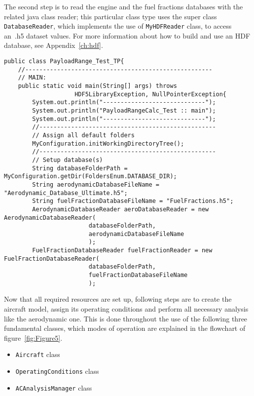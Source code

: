 The second step is to read the engine and the fuel fractions databases with the related java class reader; this particular class type uses the super class \lstinline[language=Java]!DatabaseReader!, which implements the use of \lstinline[language=Java]!MyHDFReader! class, to access an~.h5 dataset values. For more information about how to build and use an HDF database, see Appendix~\ref{ch:hdf}.

\bigskip
\begin{lstlisting}[caption={Excerpt of the ATR-72 Payload-Range test - preliminary steps}, captionpos=b, tabsize=2]
public class PayloadRange_Test_TP{
	//-----------------------------------------------------
	// MAIN:
	public static void main(String[] args) throws
					HDF5LibraryException, NullPointerException{
		System.out.println("-----------------------------");
		System.out.println("PayloadRangeCalc_Test :: main");
		System.out.println("-----------------------------");
		//--------------------------------------------------
		// Assign all default folders
		MyConfiguration.initWorkingDirectoryTree();
		//--------------------------------------------------
		// Setup database(s)	
		String databaseFolderPath = MyConfiguration.getDir(FoldersEnum.DATABASE_DIR);
		String aerodynamicDatabaseFileName = "Aerodynamic_Database_Ultimate.h5";
		String fuelFractionDatabaseFileName = "FuelFractions.h5";
		AerodynamicDatabaseReader aeroDatabaseReader = new AerodynamicDatabaseReader(
						databaseFolderPath,
						aerodynamicDatabaseFileName
						);
		FuelFractionDatabaseReader fuelFractionReader = new FuelFractionDatabaseReader(
						databaseFolderPath,
						fuelFractionDatabaseFileName
						);
\end{lstlisting}

\noindent
Now that all required resources are set up, following steps are to create the aircraft model, assign its operating conditions and perform all necessary analysis like the aerodynamic one. This is done throughout the use of the following three fundamental classes, which modes of operation are explained in the flowchart of figure~\ref{fig:Figure5}.

\begin{itemize}
\item\lstinline[language=Java]!Aircraft! class
\item\lstinline[language=Java]!OperatingConditions! class
\item\lstinline[language=Java]!ACAnalysisManager! class
\end{itemize}

